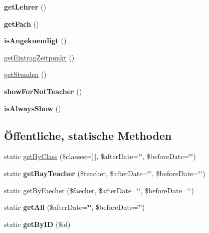 \begin{DoxyCompactItemize}
{\bfseries get\+Lehrer} ()
\item 
\mbox{\label{class_leistungsnachweis_afa128431b3a4ef2fae4438a6a449ee93}} 
{\bfseries get\+Fach} ()
\item 
\mbox{\label{class_leistungsnachweis_a4e04c8c313d57240849d646826dd3a26}} 
{\bfseries is\+Angekuendigt} ()
\item 
\mbox{\hyperlink{class_leistungsnachweis_a8601c453c09d1e3f076ba483499c5b80}{get\+Eintrag\+Zeitpunkt}} ()
\item 
\mbox{\hyperlink{class_leistungsnachweis_affea613a23892da3b5c1cbef16eae7dc}{get\+Stunden}} ()
\item 
\mbox{\label{class_leistungsnachweis_a35b32a5369224d049379dd51a69014c1}} 
{\bfseries show\+For\+Not\+Teacher} ()
\item 
\mbox{\label{class_leistungsnachweis_a2438deabb2e3b292215a166b306bacfc}} 
{\bfseries is\+Always\+Show} ()
\end{DoxyCompactItemize}
\subsection*{Öffentliche, statische Methoden}
\begin{DoxyCompactItemize}
\item 
static \mbox{\hyperlink{class_leistungsnachweis_ad5df05a9ef6e47a6a525593508760bad}{get\+By\+Class}} (\$classes=\mbox{[}$\,$\mbox{]}, \$after\+Date=\char`\"{}\char`\"{}, \$before\+Date=\char`\"{}\char`\"{})
\item 
\mbox{\label{class_leistungsnachweis_a6ec5bf056243f0f628414411c5beb183}} 
static {\bfseries get\+Bay\+Teacher} (\$teacher, \$after\+Date=\char`\"{}\char`\"{}, \$before\+Date=\char`\"{}\char`\"{})
\item 
static \mbox{\hyperlink{class_leistungsnachweis_a1a059026e964220e828e8a6e6cb5e2d1}{get\+By\+Faecher}} (\$faecher, \$after\+Date=\char`\"{}\char`\"{}, \$before\+Date=\char`\"{}\char`\"{})
\item 
\mbox{\label{class_leistungsnachweis_ae2d736df119819818a4e764aff182830}} 
static {\bfseries get\+All} (\$after\+Date=\char`\"{}\char`\"{}, \$before\+Date=\char`\"{}\char`\"{})
\item 
\mbox{\label{class_leistungsnachweis_a44a42d9e10bacd2a0df04c1b5cb0bb4e}} 
static {\bfseries get\+By\+ID} (\$id)
\end{DoxyCompactItemize}

